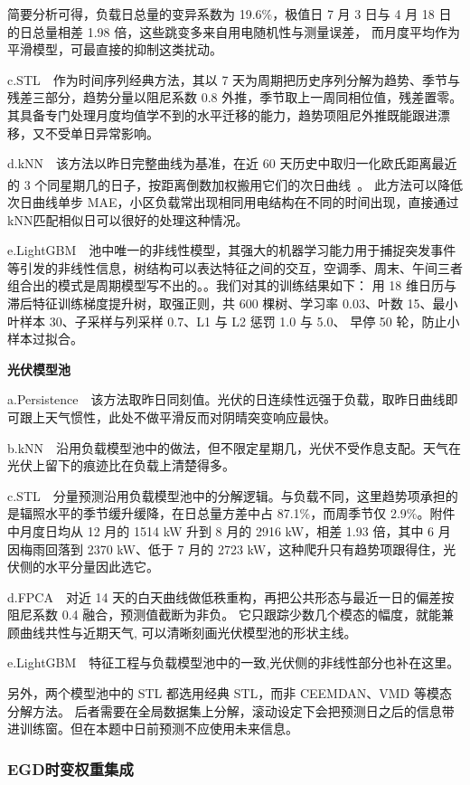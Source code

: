 \documentclass[zihao=-4,a4paper,fontset=none]{ctexart}
\newcommand{\upcite}[1]{\textsuperscript{\cite{#1}}}
\begin{document}
简要分析可得，负载日总量的变异系数为 19.6\%，极值日 7 月 3 日与 4 月 18 日的日总量相差 1.98 倍，这些跳变多来自用电随机性与测量误差，
而月度平均作为平滑模型，可最直接的抑制这类扰动。

c.STL\ \  作为时间序列经典方法，其以 7 天为周期把历史序列分解为趋势、季节与残差三部分，趋势分量以阻尼系数 0.8 外推，季节取上一周同相位值，残差置零。
其具备专门处理月度均值学不到的水平迁移的能力，趋势项阻尼外推既能跟进漂移，又不受单日异常影响。

d.kNN\ \  该方法以昨日完整曲线为基准，在近 60 天历史中取归一化欧氏距离最近的 3 个同星期几的日子，按距离倒数加权搬用它们的次日曲线~\upcite{akyurek2014}。
此方法可以降低次日曲线单步 MAE，小区负载常出现相同用电结构在不同的时间出现，直接通过kNN匹配相似日可以很好的处理这种情况。

e.LightGBM\ \  池中唯一的非线性模型，其强大的机器学习能力用于捕捉突发事件等引发的非线性信息，树结构可以表达特征之间的交互，空调季、周末、午间三者组合出的模式是周期模型写不出的。。我们对其的训练结果如下：
用 18 维日历与滞后特征训练梯度提升树，取强正则，共 600 棵树、学习率 0.03、叶数 15、最小叶样本 30、子采样与列采样 0.7、L1 与 L2 惩罚 1.0 与 5.0、
早停 50 轮，防止小样本过拟合。


\textbf{光伏模型池}


a.Persistence\ \  该方法取昨日同刻值。光伏的日连续性远强于负载，取昨日曲线即可跟上天气惯性，此处不做平滑反而对阴晴突变响应最快。

b.kNN\ \  沿用负载模型池中的做法，但不限定星期几，光伏不受作息支配。天气在光伏上留下的痕迹比在负载上清楚得多。

c.STL\ \  分量预测沿用负载模型池中的分解逻辑。与负载不同，这里趋势项承担的是辐照水平的季节缓升缓降，在日总量方差中占 87.1\%，而周季节仅 2.9\%。附件中月度日均从 12 月的 1514 kW 升到 8 月的 2916 kW，相差 1.93 倍，其中 6 月因梅雨回落到 2370 kW、低于 7 月的 2723 kW，这种爬升只有趋势项跟得住，光伏侧的水平分量因此选它。

d.FPCA\ \  对近 14 天的白天曲线做低秩重构，再把公共形态与最近一日的偏差按阻尼系数 0.4 融合，预测值截断为非负。
它只跟踪少数几个模态的幅度，就能兼顾曲线共性与近期天气, 可以清晰刻画光伏模型池的形状主线。

e.LightGBM\ \ 特征工程与负载模型池中的一致,光伏侧的非线性部分也补在这里。

另外，两个模型池中的 STL 都选用经典 STL，而非 CEEMDAN、VMD 等模态分解方法。
后者需要在全局数据集上分解，滚动设定下会把预测日之后的信息带进训练窗。但在本题中日前预测不应使用未来信息。


\subsubsection{EGD时变权重集成}
\end{document}
